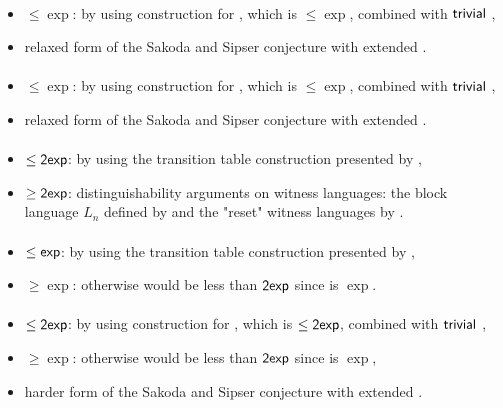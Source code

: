 \paragraph{\ONFA{}\tto\ODLA}
\begin{itemize}
	\item $\le\exp$: by using construction for \hyperref[cost:1NFAto1DFA]{\ONFA{}\tto\ODFA}, which is $\le\exp$, combined with $\mathsf{trivial}$ \ODFA{}\tto\ODLA,
	\item relaxed form of the Sakoda and Sipser conjecture with extended \TDFA.
\end{itemize}
\paragraph{\TNFA{}\tto\ODLA}
\begin{itemize}
	\item $\le\exp$: by using construction for \hyperref[cost:2NFAto1DFA]{\TNFA{}\tto\ODFA}, which is $\le\exp$, combined with $\mathsf{trivial}$ \ODFA{}\tto\ODLA,
	\item relaxed form of the Sakoda and Sipser conjecture with extended \TDFA.
\end{itemize}
\paragraph{\OLA{}\tto\ODFA}\label{cost:1LAto1DFA}
\begin{itemize}
	\item $\le\mathsf{2exp}$: by using the transition table construction presented by ,
	\item $\ge\mathsf{2exp}$: distinguishability arguments on witness languages: the block language $L_n$ defined by  and the "reset" witness languages by .
\end{itemize}
\paragraph{\OLA{}\tto\ONFA}\label{cost:1LAto1NFA}
\begin{itemize}
	\item $\le\mathsf{exp}$: by using the transition table construction presented by ,
	\item $\ge\exp$: otherwise \hyperref[cost:1LAto1DFA]{\OLA{}\tto\ODFA} would be less than $\mathsf{2exp}$ since \hyperref[cost:1NFAto1DFA]{\ONFA{}\tto\ODFA} is $\exp$.
\end{itemize}
\paragraph{\OLA{}\tto\TDFA}
\begin{itemize}
	\item $\le\mathsf{2exp}$: by using construction for \hyperref[cost:1LAto1DFA]{\OLA{}\tto\ODFA}, which is $\le\mathsf{2exp}$, combined with $\mathsf{trivial}$ \ODFA{}\tto\TDFA,
	\item $\ge\exp$: otherwise \hyperref[cost:1LAto1DFA]{\OLA{}\tto\ODFA} would be less than $\mathsf{2exp}$ since \hyperref[cost:2DFAto1DFA]{\TDFA{}\tto\ODFA} is $\exp$,
	\item harder form of the Sakoda and Sipser conjecture with extended \TNFA.
\end{itemize}
